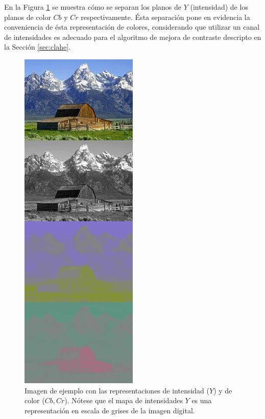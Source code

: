En la Figura \ref{fig:ejemploycbcr} se muestra cómo se separan los planos de $Y$ (intensidad) de los planos de color $Cb$ y $Cr$ respectivamente. Ésta separación pone en evidencia la conveniencia de ésta representación de colores, considerando que utilizar un canal de intensidades es adecuado para el algoritmo de mejora de contraste descripto en la Sección \ref{sec:clahe}.
\fboxrule=2pt
\begin{figure}[H]
\centering
    \includegraphics[width=0.50\textwidth, frame]{./Figures/220px-Barns_grand_tetons_YCbCr_separation.jpg}
\caption{Imagen de ejemplo con las representaciones de intensidad ($Y$) y de color ($Cb,Cr$). Nótese que el mapa de intensidades $Y$ es una representación en escala de grises de la imagen digital.}\label{fig:ejemploycbcr}
\end{figure}

